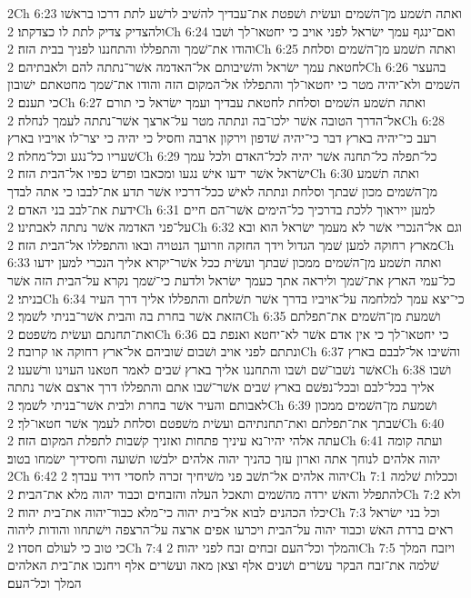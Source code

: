 2Ch 6:23  ואתה תשׁמע מן־השׁמים ועשׂית ושׁפטת את־עבדיך להשׁיב לרשׁע לתת דרכו בראשׁו ולהצדיק צדיק לתת לו כצדקתו׃
2Ch 6:24  ואם־ינגף עמך ישׂראל לפני אויב כי יחטאו־לך ושׁבו והודו את־שׁמך והתפללו והתחננו לפניך בבית הזה׃
2Ch 6:25  ואתה תשׁמע מן־השׁמים וסלחת לחטאת עמך ישׂראל והשׁיבותם אל־האדמה אשׁר־נתתה להם ולאבתיהם׃
2Ch 6:26  בהעצר השׁמים ולא־יהיה מטר כי יחטאו־לך והתפללו אל־המקום הזה והודו את־שׁמך מחטאתם ישׁובון כי תענם׃
2Ch 6:27  ואתה תשׁמע השׁמים וסלחת לחטאת עבדיך ועמך ישׂראל כי תורם אל־הדרך הטובה אשׁר ילכו־בה ונתתה מטר על־ארצך אשׁר־נתתה לעמך לנחלה׃
2Ch 6:28  רעב כי־יהיה בארץ דבר כי־יהיה שׁדפון וירקון ארבה וחסיל כי יהיה כי יצר־לו אויביו בארץ שׁעריו כל־נגע וכל־מחלה׃
2Ch 6:29  כל־תפלה כל־תחנה אשׁר יהיה לכל־האדם ולכל עמך ישׂראל אשׁר ידעו אישׁ נגעו ומכאבו ופרשׂ כפיו אל־הבית הזה׃
2Ch 6:30  ואתה תשׁמע מן־השׁמים מכון שׁבתך וסלחת ונתתה לאישׁ ככל־דרכיו אשׁר תדע את־לבבו כי אתה לבדך ידעת את־לבב בני האדם׃
2Ch 6:31  למען ייראוך ללכת בדרכיך כל־הימים אשׁר־הם חיים על־פני האדמה אשׁר נתתה לאבתינו׃
2Ch 6:32  וגם אל־הנכרי אשׁר לא מעמך ישׂראל הוא ובא מארץ רחוקה למען שׁמך הגדול וידך החזקה וזרועך הנטויה ובאו והתפללו אל־הבית הזה׃
2Ch 6:33  ואתה תשׁמע מן־השׁמים ממכון שׁבתך ועשׂית ככל אשׁר־יקרא אליך הנכרי למען ידעו כל־עמי הארץ את־שׁמך וליראה אתך כעמך ישׂראל ולדעת כי־שׁמך נקרא על־הבית הזה אשׁר בניתי׃
2Ch 6:34  כי־יצא עמך למלחמה על־אויביו בדרך אשׁר תשׁלחם והתפללו אליך דרך העיר הזאת אשׁר בחרת בה והבית אשׁר־בניתי לשׁמך׃
2Ch 6:35  ושׁמעת מן־השׁמים את־תפלתם ואת־תחנתם ועשׂית משׁפטם׃
2Ch 6:36  כי יחטאו־לך כי אין אדם אשׁר לא־יחטא ואנפת בם ונתתם לפני אויב ושׁבום שׁוביהם אל־ארץ רחוקה או קרובה׃
2Ch 6:37  והשׁיבו אל־לבבם בארץ אשׁר נשׁבו־שׁם ושׁבו והתחננו אליך בארץ שׁבים לאמר חטאנו העוינו ורשׁענו׃
2Ch 6:38  ושׁבו אליך בכל־לבם ובכל־נפשׁם בארץ שׁבים אשׁר־שׁבו אתם והתפללו דרך ארצם אשׁר נתתה לאבותם והעיר אשׁר בחרת ולבית אשׁר־בניתי לשׁמך׃
2Ch 6:39  ושׁמעת מן־השׁמים ממכון שׁבתך את־תפלתם ואת־תחנתיהם ועשׂית משׁפטם וסלחת לעמך אשׁר חטאו־לך׃
2Ch 6:40  עתה אלהי יהיו־נא עיניך פתחות ואזניך קשׁבות לתפלת המקום הזה׃
2Ch 6:41  ועתה קומה יהוה אלהים לנוחך אתה וארון עזך כהניך יהוה אלהים ילבשׁו תשׁועה וחסידיך ישׂמחו בטוב׃
2Ch 6:42  יהוה אלהים אל־תשׁב פני משׁיחיך זכרה לחסדי דויד עבדך׃
2Ch 7:1  וככלות שׁלמה להתפלל והאשׁ ירדה מהשׁמים ותאכל העלה והזבחים וכבוד יהוה מלא את־הבית׃
2Ch 7:2  ולא יכלו הכהנים לבוא אל־בית יהוה כי־מלא כבוד־יהוה את־בית יהוה׃
2Ch 7:3  וכל בני ישׂראל ראים ברדת האשׁ וכבוד יהוה על־הבית ויכרעו אפים ארצה על־הרצפה וישׁתחוו והודות ליהוה כי טוב כי לעולם חסדו׃
2Ch 7:4  והמלך וכל־העם זבחים זבח לפני יהוה׃
2Ch 7:5  ויזבח המלך שׁלמה את־זבח הבקר עשׂרים ושׁנים אלף וצאן מאה ועשׂרים אלף ויחנכו את־בית האלהים המלך וכל־העם׃
